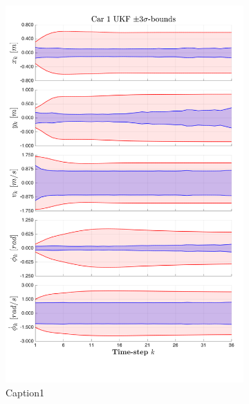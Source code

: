 \begin{figure}[ht]
    \begin{subfigure}{0.48\textwidth}
    \includegraphics[width=0.9\linewidth]{include/images/car1.png} 
    \caption{Caption1}
    \label{fig:subim1}
    \end{subfigure}
    \begin{subfigure}{0.48\textwidth}

\end{subfigure}
\end{figure}
